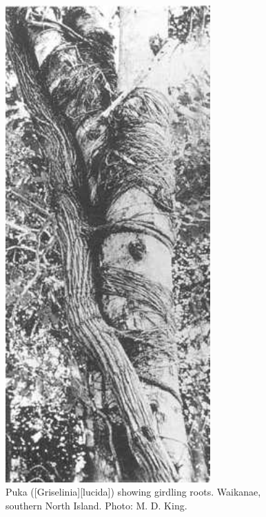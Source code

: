 \begin{figure}[htb]
	\centering
	\begin{minipage}[t]{0.413\textwidth}
		\centering
		\includegraphics[width=0.7\textwidth]{graphics/figure48puka-roots.jpg}
    	\caption[Puka (\emph{Griselinia lucida}) showing girdling roots]{Puka ([Griselinia][lucida]) showing girdling roots.
    	Waikanae, southern North Island.
    	Photo: M. D. King.}%
    	\label{fig:48puka-roots}
	\end{minipage}\hfill%
	\begin{minipage}[t]{0.567\textwidth}
    	\centering

\end{minipage}
\end{figure}
